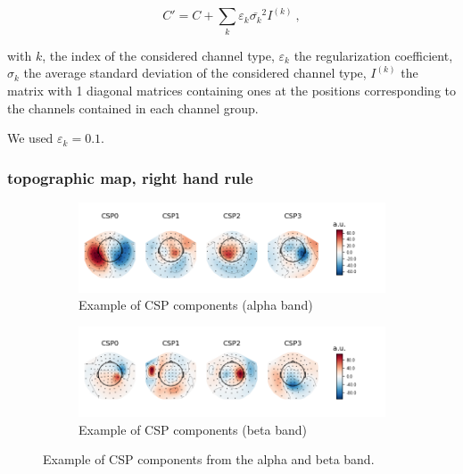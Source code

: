 \begin{equation}
    C' = C + \sum_k {\varepsilon_k \bar{\sigma_k}^2 I^{(k)}}\ ,
\end{equation}

with $k$, the index of the considered channel type, $\varepsilon_k$ the regularization coefficient, $\sigma_k$ the average standard deviation of the considered channel type, $I^{(k)}$ the matrix with 1 diagonal matrices containing ones at the positions corresponding to the channels contained in each channel group.

We used $\varepsilon_k = 0.1$.


\subsubsection{topographic map, right hand rule}

\begin{figure}
    \centering
    \begin{subfigure}[b]{0.55\textwidth}
       \includegraphics[width=1\linewidth]{images_report/sensor/csp_individual/sub_155_alpha.png}
       \caption{Example of CSP components (alpha band)}
       \label{fig:csp_component_alpha_band}
    \end{subfigure}
    
    \begin{subfigure}[b]{0.55\textwidth}
       \includegraphics[width=1\linewidth]{images_report/sensor/csp_individual/sub_215_beta.png}
       \caption{Example of CSP components (beta band)}
       \label{fig:csp_component_beta_band}
    \end{subfigure}

    \caption[Example of CSP components from the alpha and beta band.]%
    {Example of CSP components from the alpha and beta band.}
    \label{example_csp_component}
\end{figure}


